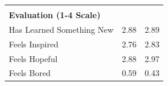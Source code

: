 \documentclass[10pt]{beamer}
\begin{document}
\begin{frame}
{{\begin{table}[htbp]
\begin{tabular}{lcc}
          																				&       &        \\
    \multicolumn{1}{l}{\textbf{Evaluation (1-4 Scale)}} 								&       &         \\
    \multicolumn{1}{l}{Has Learned Something New} 										& 2.88  & 2.89   \\
    \multicolumn{1}{l}{Feels Inspired} 													& 2.76  & 2.83   \\
    \multicolumn{1}{l}{Feels Hopeful} 													& 2.88  & 2.97  \\
    \multicolumn{1}{l}{Feels Bored} 													& 0.59  & 0.43   \\
    \end{tabular}

\end{table}}}
\end{frame}
\end{document}
